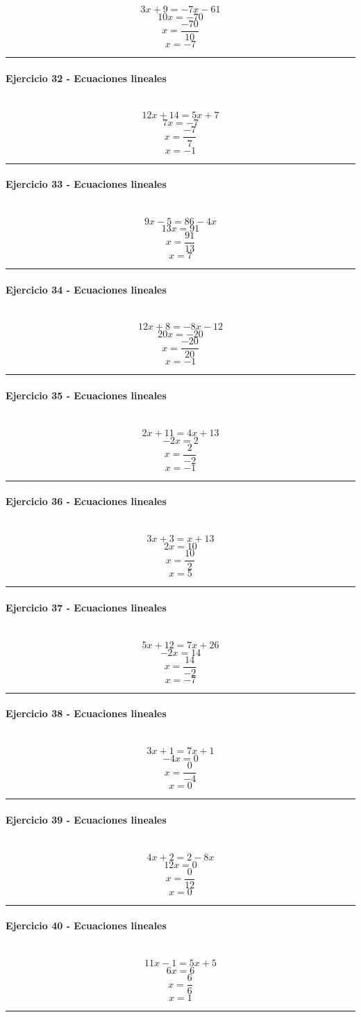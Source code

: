 \documentclass[10pt,a4paper]{article}
\newcommand{\res}[1]{\paragraph{#1}\mbox{}\\[-1.2em]}
\begin{document}
\[ 3 x + 9=- 7 x - 61 \]
\[ 10 x=-70 \]
\[ x=\frac{-70}{10} \]
\[ \boxed{x=-7} \]
\vspace{1mm}\hrule\vspace{2mm}
\res{Ejercicio 32 - Ecuaciones lineales}
\[ 12 x + 14=5 x + 7 \]
\[ 7 x=-7 \]
\[ x=\frac{-7}{7} \]
\[ \boxed{x=-1} \]
\vspace{1mm}\hrule\vspace{2mm}
\res{Ejercicio 33 - Ecuaciones lineales}
\[ 9 x - 5=86 - 4 x \]
\[ 13 x=91 \]
\[ x=\frac{91}{13} \]
\[ \boxed{x=7} \]
\vspace{1mm}\hrule\vspace{2mm}
\res{Ejercicio 34 - Ecuaciones lineales}
\[ 12 x + 8=- 8 x - 12 \]
\[ 20 x=-20 \]
\[ x=\frac{-20}{20} \]
\[ \boxed{x=-1} \]
\vspace{1mm}\hrule\vspace{2mm}
\res{Ejercicio 35 - Ecuaciones lineales}
\[ 2 x + 11=4 x + 13 \]
\[ - 2 x=2 \]
\[ x=\frac{2}{-2} \]
\[ \boxed{x=-1} \]
\vspace{1mm}\hrule\vspace{2mm}
\res{Ejercicio 36 - Ecuaciones lineales}
\[ 3 x + 3=x + 13 \]
\[ 2 x=10 \]
\[ x=\frac{10}{2} \]
\[ \boxed{x=5} \]
\vspace{1mm}\hrule\vspace{2mm}
\res{Ejercicio 37 - Ecuaciones lineales}
\[ 5 x + 12=7 x + 26 \]
\[ - 2 x=14 \]
\[ x=\frac{14}{-2} \]
\[ \boxed{x=-7} \]
\vspace{1mm}\hrule\vspace{2mm}
\res{Ejercicio 38 - Ecuaciones lineales}
\[ 3 x + 1=7 x + 1 \]
\[ - 4 x=0 \]
\[ x=\frac{0}{-4} \]
\[ \boxed{x=0} \]
\vspace{1mm}\hrule\vspace{2mm}
\res{Ejercicio 39 - Ecuaciones lineales}
\[ 4 x + 2=2 - 8 x \]
\[ 12 x=0 \]
\[ x=\frac{0}{12} \]
\[ \boxed{x=0} \]
\vspace{1mm}\hrule\vspace{2mm}
\res{Ejercicio 40 - Ecuaciones lineales}
\[ 11 x - 1=5 x + 5 \]
\[ 6 x=6 \]
\[ x=\frac{6}{6} \]
\[ \boxed{x=1} \]
\vspace{1mm}\hrule\vspace{2mm}
\end{document}
